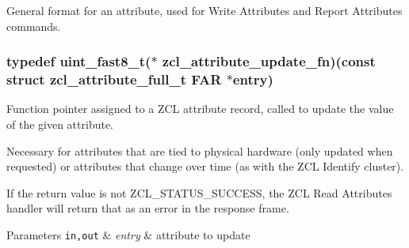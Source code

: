 General format for an attribute, used for Write Attributes and Report Attributes commands. 

\hypertarget{group__zcl_ga9a022bce8add8364fde3ab5cc75354ef}{
\subsubsection[{zcl\-\_\-attribute\-\_\-update\-\_\-fn}]{\setlength{\rightskip}{0pt plus 5cm}typedef uint\-\_\-fast8\-\_\-t($\ast$ zcl\-\_\-attribute\-\_\-update\-\_\-fn)(const struct {\bf zcl\-\_\-attribute\-\_\-full\-\_\-t} {\bf F\-A\-R} $\ast$entry)}}\label{group__zcl_ga9a022bce8add8364fde3ab5cc75354ef}


Function pointer assigned to a Z\-C\-L attribute record, called to update the value of the given attribute. 

Necessary for attributes that are tied to physical hardware (only updated when requested) or attributes that change over time (as with the Z\-C\-L Identify cluster).

If the return value is not Z\-C\-L\-\_\-\-S\-T\-A\-T\-U\-S\-\_\-\-S\-U\-C\-C\-E\-S\-S, the Z\-C\-L Read Attributes handler will return that as an error in the response frame.


\begin{DoxyParams}[1]{Parameters}
\mbox{\tt in,out}  & {\em entry} & attribute to update\\
\hline
\end{DoxyParams}

